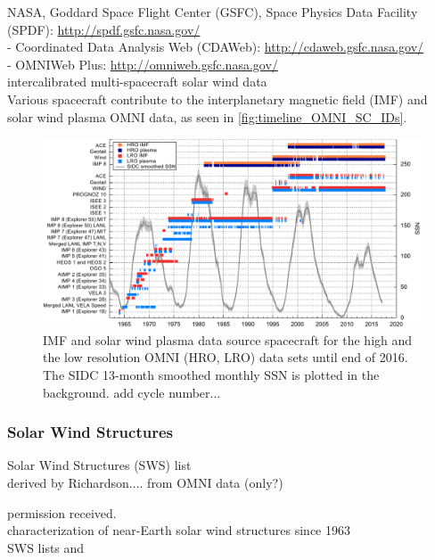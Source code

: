 NASA, Goddard Space Flight Center (GSFC), Space Physics Data Facility (SPDF): \url{http://spdf.gsfc.nasa.gov/}\\	%
- Coordinated Data Analysis Web (CDAWeb): \url{http://cdaweb.gsfc.nasa.gov/}\\	%
- OMNIWeb Plus: \url{http://omniweb.gsfc.nasa.gov/}\\	%

intercalibrated multi-spacecraft solar wind data\\
Various spacecraft contribute to the interplanetary magnetic field (IMF) and solar wind plasma OMNI data, as seen in \autoref{fig:timeline_OMNI_SC_IDs}.\\
\begin{figure}[htb]
	\centering
	\includegraphics[width=\textwidth]{images/gnuplots/timeline_OMNI_SC_IDs.pdf}
	\caption{IMF and solar wind plasma data source spacecraft for the high and the low resolution OMNI (HRO, LRO) data sets until end of 2016. The SIDC 13-month smoothed monthly SSN is plotted in the background. add cycle number...}
	\label{fig:timeline_OMNI_SC_IDs}
\end{figure}

\subsubsection{Solar Wind Structures}
Solar Wind Structures (SWS) list\\
derived by Richardson.... from OMNI data (only?)

permission received.\\

characterization of near-Earth solar wind structures since 1963\\
SWS lists \citep{Richardson2000} and \citep{Richardson2012}


